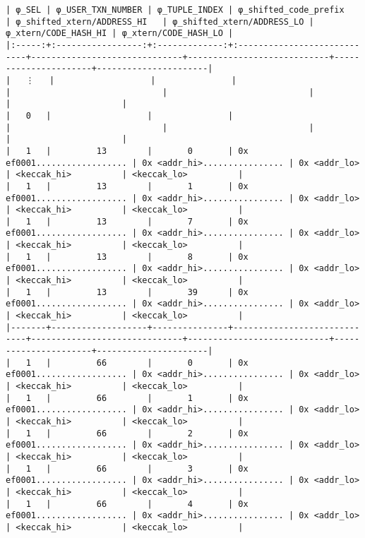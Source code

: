 \documentclass[varwidth=\maxdimen,margin=0.5cm,multi={verbatim}]{standalone}
\begin{document}
\begin{verbatim}
| φ_SEL | φ_USER_TXN_NUMBER | φ_TUPLE_INDEX | φ_shifted_code_prefix       | φ_shifted_xtern/ADDRESS_HI   | φ_shifted_xtern/ADDRESS_LO | φ_xtern/CODE_HASH_HI | φ_xtern/CODE_HASH_LO |
|:-----:+:-----------------:+:-------------:+:----------------------------+------------------------------+----------------------------+----------------------+----------------------|
|   ⋮   |                   |               |                             |                              |                            |                      |                      |
|   0   |                   |               |                             |                              |                            |                      |                      |
|   1   |         13        |       0       | 0x ef0001.................. | 0x <addr_hi>................ | 0x <addr_lo>               | <keccak_hi>          | <keccak_lo>          |
|   1   |         13        |       1       | 0x ef0001.................. | 0x <addr_hi>................ | 0x <addr_lo>               | <keccak_hi>          | <keccak_lo>          |
|   1   |         13        |       7       | 0x ef0001.................. | 0x <addr_hi>................ | 0x <addr_lo>               | <keccak_hi>          | <keccak_lo>          |
|   1   |         13        |       8       | 0x ef0001.................. | 0x <addr_hi>................ | 0x <addr_lo>               | <keccak_hi>          | <keccak_lo>          |
|   1   |         13        |       39      | 0x ef0001.................. | 0x <addr_hi>................ | 0x <addr_lo>               | <keccak_hi>          | <keccak_lo>          |
|-------+-------------------+---------------+-----------------------------+------------------------------+----------------------------+----------------------+----------------------|
|   1   |         66        |       0       | 0x ef0001.................. | 0x <addr_hi>................ | 0x <addr_lo>               | <keccak_hi>          | <keccak_lo>          |
|   1   |         66        |       1       | 0x ef0001.................. | 0x <addr_hi>................ | 0x <addr_lo>               | <keccak_hi>          | <keccak_lo>          |
|   1   |         66        |       2       | 0x ef0001.................. | 0x <addr_hi>................ | 0x <addr_lo>               | <keccak_hi>          | <keccak_lo>          |
|   1   |         66        |       3       | 0x ef0001.................. | 0x <addr_hi>................ | 0x <addr_lo>               | <keccak_hi>          | <keccak_lo>          |
|   1   |         66        |       4       | 0x ef0001.................. | 0x <addr_hi>................ | 0x <addr_lo>               | <keccak_hi>          | <keccak_lo>          |

\end{verbatim}
\end{document}

